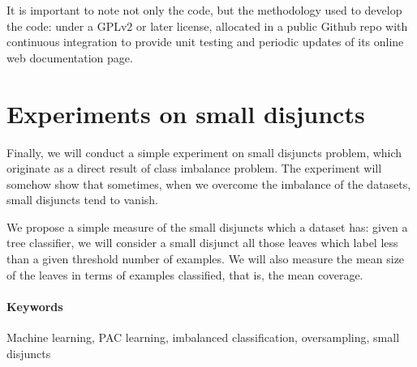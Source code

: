 It is important to note not only the code, but the methodology used to develop the code: under a GPLv2 or later license,
allocated in a public Github repo with continuous integration to provide unit testing and periodic updates of
its online web documentation page.

\section*{Experiments on small disjuncts}
Finally, we will conduct a simple experiment on small disjuncts problem, which originate as a direct result of class imbalance
problem. The experiment will somehow show that sometimes, when we overcome the imbalance of the datasets, small disjuncts tend to
vanish.

We propose a simple measure of the small disjuncts which a dataset has: given a tree classifier, we will consider a small
disjunct all those leaves which label less than a given threshold number of examples. We will also measure the mean size of the 
leaves in terms of examples classified, that is, the mean coverage.

\paragraph{Keywords}
Machine learning, PAC learning, imbalanced classification, oversampling, small disjuncts